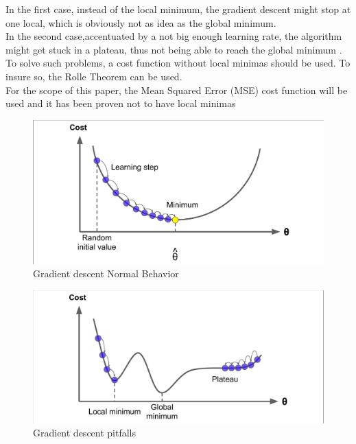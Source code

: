 \documentclass[conference]{IEEEtran}
\begin{document}
In the first case, instead of the local minimum, the gradient descent might stop at one local, which is obviously not as idea as the global minimum.\\
In the second case,accentuated by a not big enough learning rate, the algorithm might get stuck in a plateau, thus not being able to reach the global minimum \cite{Scikit-Learn}. 
To solve such problems, a cost function without local minimas should be used. To insure so, the Rolle Theorem can be used\cite{rollle}. \\For the scope of this paper, the Mean Squared Error (MSE) cost function will be used and it has been proven not to have local minimas



\begin{figure}[htbp]
    \includegraphics[scale=0.3]{Figures/GradientDescentNormal.jpeg}
    \caption{Gradient descent Normal Behavior\cite{Scikit-Learn}}
    \label{fig:normalbeh}
\end{figure}
\begin{figure}[htbp]
    \includegraphics[scale=0.3]{Figures/GradientDescentPitfalls.png}
    \caption{Gradient descent pitfalls\cite{Scikit-Learn}}
    \label{fig:pitfallsbeh}
\end{figure}
\end{document}
